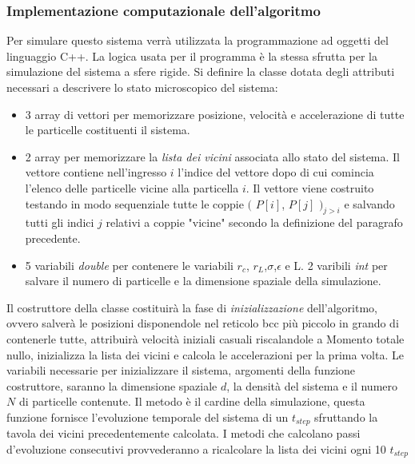 \FloatBarrier 
\subsubsection{Implementazione computazionale dell'algoritmo}
Per simulare questo sistema verrà utilizzata la programmazione ad oggetti del linguaggio C++.
La logica usata per il programma è la stessa sfrutta per la simulazione del sistema a sfere rigide.
\newline
Si definire la classe  dotata degli attributi necessari a descrivere lo stato microscopico del sistema:
\begin{itemize}
\item 3 array di vettori per memorizzare posizione, velocità e accelerazione di tutte le particelle costituenti il sistema.

\item 2 array per memorizzare la \emph{lista dei vicini} associata allo stato del sistema. Il vettore  contiene nell'ingresso $i$ l'indice del vettore  dopo di cui comincia l'elenco delle particelle vicine alla particella $i$. Il vettore  viene costruito testando in modo sequenziale tutte le coppie $($ $P[i]$, $P[j]$ $)_{j>i}$ e salvando tutti gli indici $j$ relativi a coppie "vicine" secondo la definizione del paragrafo precedente.

\item 5 variabili \emph{double} per contenere le variabili $r_c$, $r_L$,$\sigma$,$\epsilon$ e L. 2 varibili \emph{int} per salvare il numero di particelle e la dimensione spaziale della simulazione.

\end{itemize}
Il costruttore della classe costituirà la fase di \emph{inizializzazione} dell'algoritmo, ovvero salverà le posizioni disponendole nel reticolo bcc più piccolo in grando di contenerle tutte, attribuirà velocità iniziali casuali riscalandole a Momento totale nullo, inizializza la lista dei vicini e calcola le accelerazioni per la prima volta.
Le variabili necessarie per inizializzare il sistema, argomenti della funzione costruttore, saranno la dimensione spaziale $d$, la densità del sistema e il numero $N$ di particelle contenute.
\medskip\newline
Il metodo  è il cardine della simulazione, questa funzione fornisce l'evoluzione temporale del sistema di un $t_{step}$ sfruttando la tavola dei vicini precedentemente calcolata. I metodi che calcolano passi d'evoluzione consecutivi provvederanno a ricalcolare la lista dei vicini ogni 10 $t_{step}$
